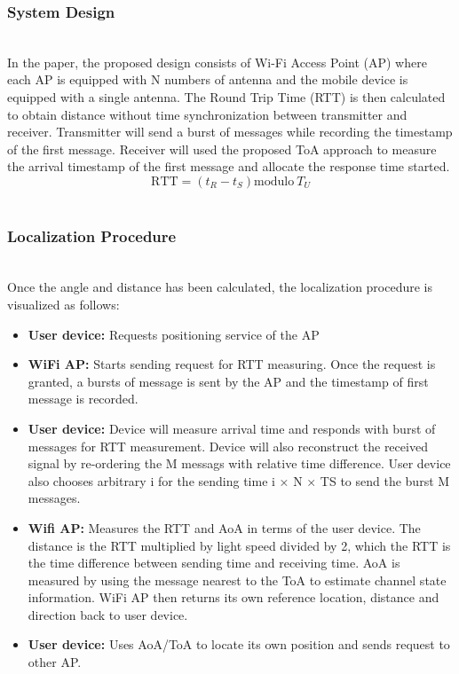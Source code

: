 \documentclass{l4proj}
\begin{document}
\subsubsection{System Design}~\\
In the paper, the proposed design consists of Wi-Fi Access Point (AP) where each AP is equipped with N numbers of antenna and the mobile device is equipped with a single antenna. The Round Trip Time (RTT) is then calculated to obtain distance without time synchronization between transmitter and receiver. Transmitter will send a burst of messages while recording the timestamp of the first message. Receiver will used the proposed ToA approach to measure the arrival timestamp of the first message and allocate the response time started.
\begin{equation*} \text{RTT}=(t_{R}-t_{S})\text{modulo}\ T_{U} \end{equation*}
\cite{design}\\
\subsubsection{Localization Procedure}~\\
Once the angle and distance has been calculated, the localization procedure is visualized as follows:
\begin{itemize}
\item
\textbf{User device:} Requests positioning service of the AP
\item
\textbf{WiFi AP:} Starts sending request for RTT measuring. Once the request is granted, a bursts of message is sent by the AP and the timestamp of first message is recorded.
\item
\textbf{User device:} Device will measure arrival time and responds with burst of messages for RTT measurement. Device will also reconstruct the received signal by re-ordering the M messags with relative time difference. User device also chooses arbitrary i for the sending time i × N × TS to send the burst M messages.
\item
\textbf{Wifi AP:} Measures the RTT and AoA in terms of the user device. The distance is the RTT multiplied by light speed divided by 2, which the RTT is the time difference between sending time and receiving time. AoA is measured by using the message nearest to the ToA to estimate channel state information. WiFi AP then returns its own reference location, distance and direction back to user device.
\item
\textbf{User device:} Uses AoA/ToA to locate its own position and sends request to other AP.
\end{itemize}\cite{localprocedure}\\
\end{document}
